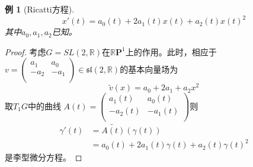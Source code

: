 \documentclass[winfonts,UTF8,c5size,a4paper,fancyhdr,hyperref,titlepage,nocap]{ctexart}
\newtheorem{exa}[thm]{例}
\theoremstyle{definition}
\theoremstyle{remark}
\numberwithin{equation}{subsection}
\newcommand{\Real}{\mathbb{R}}
\newcommand{\RP}{\mathbb{R}\mathbf{P}}
\begin{document}
\begin{exa}[Ricatti方程]
\begin{equation*}
x'(t)=a_0(t)+2a_1(t)x(t)+a_2(t)x(t)^2
\end{equation*}
其中$a_0,a_1,a_2$已知。
\end{exa}
\begin{proof}
考虑$G=SL(2,\Real)$在$\RP^1$上的作用。此时，相应于
$v=\begin{pmatrix}
  a_1 & a_0 \\
  -a_2 & -a_1 \\
\end{pmatrix}\in\mathfrak{sl}(2,\Real)$的基本向量场为
\begin{equation*}
\widetilde{v}(x)=a_0+2a_1+a_2x^2
\end{equation*}
取$T_1G$中的曲线
$A(t)=\begin{pmatrix}
  a_1(t) & a_0(t) \\
  -a_2(t) & -a_1(t) \\
\end{pmatrix}$则
\begin{align*}
\gamma'(t)&=\widetilde{A(t)}(\gamma(t))\\
          &=a_0(t)+2a_1(t)\gamma(t)+a_2(t)\gamma(t)^2
\end{align*}
是李型微分方程。
\end{proof}
\end{document}
